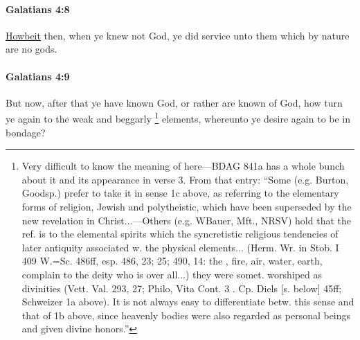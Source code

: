 		\paragraph{Galatians 4:8} %
			\label{GALATIANS-4-8}

			\hyperref[HOWBEIT]{Howbeit} then, when ye knew not God, ye did service unto them which by nature are no gods.

			\begin{framed}
			\scriptsize
				\begin{compactdesc}
					\item[SBLG] 
				\end{compactdesc}
			\end{framed}

		\paragraph{Galatians 4:9} %
			\label{GALATIANS-4-9}

			But now, after that ye have known God, or rather are known of God, how turn ye again to the weak and beggarly
				\footnote{%
					Very difficult to know the meaning of  here---BDAG 841a has a whole bunch about it and its appearance in verse 3. From that entry: ``Some (e.g. Burton, Goodsp.) prefer to take it in sense 1c above, as referring to the elementary forms of religion, Jewish and polytheistic, which have been superseded by the new revelation in Christ...---Others (e.g. WBauer, Mft., NRSV) hold that the ref. is to the elemental spirits which the syncretistic religious tendencies of later antiquity associated w. the physical elements... (Herm. Wr.  in Stob. I 409 W.=Sc. 486ff, esp. 486, 23; 25; 490, 14: the , fire, air, water, earth, complain to the deity who is over all...) they were somet. worshiped as divinities (Vett. Val. 293, 27; Philo, Vita Cont. 3 . Cp. Diels [s. below] 45ff; Schweizer 1a above). It is not always easy to differentiate betw. this sense and that of 1b above, since heavenly bodies were also regarded as personal beings and given divine honors.''
					}%
			elements, whereunto ye desire again to be in bondage?

